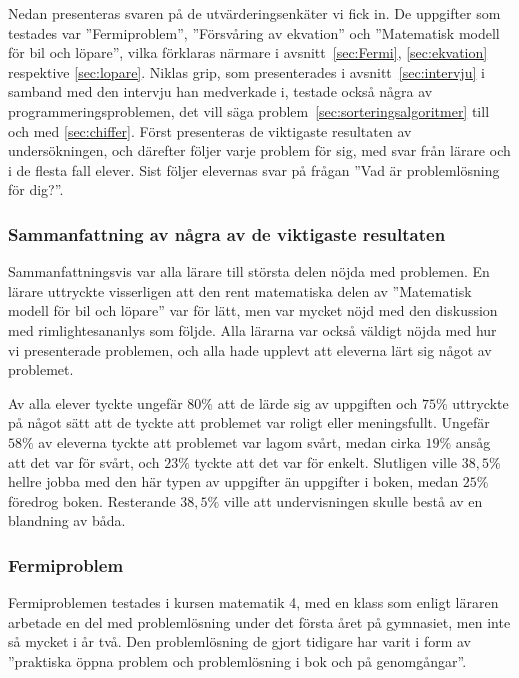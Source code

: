 \textcolor{lila}{Nedan presenteras svaren på de utvärderingsenkäter vi fick in. De uppgifter som testades var ''Fermiproblem'', ''Försvåring av ekvation'' och ''Matematisk modell för bil och löpare'', vilka förklaras närmare i avsnitt~\ref{sec:Fermi}, \ref{sec:ekvation} respektive \ref{sec:lopare}. Niklas grip, som presenterades i avsnitt~\ref{sec:intervju} i samband med den intervju han medverkade i, testade också några av programmeringsproblemen, det vill säga problem~\ref{sec:sorteringsalgoritmer} till och med \ref{sec:chiffer}. Först presenteras de viktigaste resultaten av undersökningen, och därefter följer varje problem för sig, med svar från lärare och i de flesta fall elever. Sist följer elevernas svar på frågan ''Vad är problemlösning för dig?''.}

    \subsubsection{Sammanfattning av några av de viktigaste resultaten}
    \textcolor{lila}{Sammanfattningsvis var alla lärare till största delen nöjda med problemen. En lärare uttryckte visserligen att den rent matematiska delen av ''Matematisk modell för bil och löpare'' var för lätt, men var mycket nöjd med den diskussion med rimlightesananlys som följde. Alla lärarna var också väldigt nöjda med hur vi presenterade problemen, och alla hade upplevt att eleverna lärt sig något av problemet.}
    
    \textcolor{lila}{Av alla elever tyckte ungefär $80\%$ att de lärde sig av uppgiften och $75\%$ uttryckte på något sätt att de tyckte att problemet var roligt eller meningsfullt. Ungefär $58\%$ av eleverna tyckte att problemet var lagom svårt, medan cirka $19\%$ ansåg att det var för svårt, och $23\%$ tyckte att det var för enkelt. Slutligen ville $38,5\%$ hellre jobba med den här typen av uppgifter än uppgifter i boken, medan $25\%$ föredrog boken. Resterande $38,5\%$ ville att undervisningen skulle bestå av en blandning av båda.}
    
    
    \subsubsection{Fermiproblem}
        \label{resutat:Fermi}
        \textcolor{lila}{Fermiproblemen testades i kursen matematik 4, med en klass som enligt läraren arbetade en del med problemlösning under det första året på gymnasiet, men inte så mycket i år två. Den problemlösning de gjort tidigare har varit i form av ''praktiska öppna problem och problemlösning i bok och på genomgångar''.}
        
